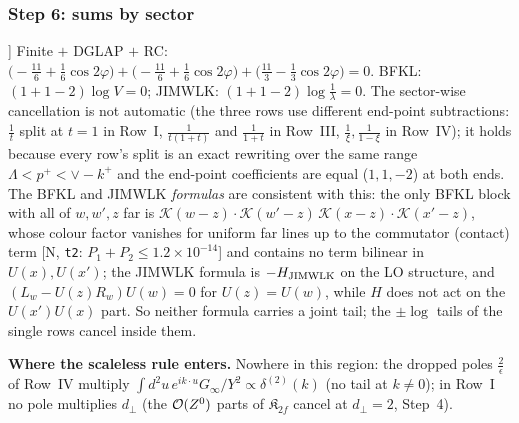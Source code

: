 \documentclass[10pt]{article}
\begin{document}
\subsubsection{Step 6: sums by sector}
\noindent [A, \texttt{t3} [5]] Finite $+$ DGLAP $+$ RC: $\big(-\frac{11}{6}+\frac16\cos2\varphi\big)+\big(-\frac{11}{6}+\frac16\cos2\varphi\big)+\big(\frac{11}{3}-\frac13\cos2\varphi\big)=0$. BFKL: $(1+1-2)\log V=0$; JIMWLK: $(1+1-2)\log\frac1\lambda=0$. The sector-wise cancellation is not automatic (the three rows use different end-point subtractions: $\frac{1}{t}$ split at $t=1$ in Row~I, $\frac{1}{t(1+t)}$ and $\frac{1}{1+t}$ in Row~III, $\frac{1}{\xi},\frac{1}{1-\xi}$ in Row~IV); it holds because every row's split is an exact rewriting over the same range $\Lambda<p^{+}<\vee-k^{+}$ and the end-point coefficients are equal ($1,1,-2$) at both ends. The BFKL and JIMWLK \emph{formulas} are consistent with this: the only BFKL block with all of $w,w',z$ far is $\mathcal{K}(w-z)\cdot\mathcal{K}(w'-z)\,\mathcal{K}(x-z)\cdot\mathcal{K}(x'-z)$, whose colour factor vanishes for uniform far lines up to the commutator (contact) term [N, \texttt{t2}: $P_{1}+P_{2}\le1.2\times10^{-14}$] and contains no term bilinear in $U(x),U(x')$; the JIMWLK formula is $-H_{\rm JIMWLK}$ on the LO structure, and $(L_{w}-U(z)R_{w})U(w)=0$ for $U(z)=U(w)$, while $H$ does not act on the $U(x')U(x)$ part. So neither formula carries a joint tail; the $\pm\log$ tails of the single rows cancel inside them.

\noindent\textbf{Where the scaleless rule enters.} Nowhere in this region: the dropped poles $\frac{2}{\epsilon}$ of Row~IV multiply $\int d^{2}u\,e^{ik\cdot u}G_{\infty}/Y^{2}\propto\delta^{(2)}(k)$ (no tail at $k\ne0$); in Row~I no pole multiplies $d_{\perp}$ (the ${\cal O}(Z^{0})$ parts of $\mathfrak{K}_{2f}$ cancel at $d_{\perp}=2$, Step~4).
\end{document}
